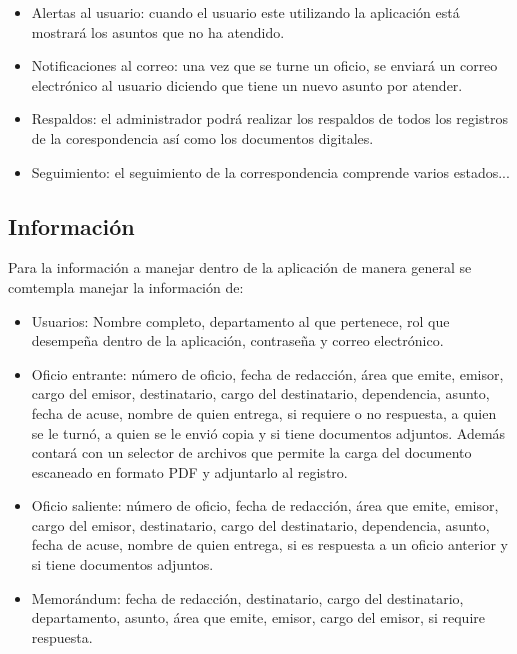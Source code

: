 \begin{itemize}
	\item Alertas al usuario: cuando el usuario este utilizando la aplicación está mostrará los asuntos que no ha atendido. 
	\item Notificaciones al correo: una vez que se turne un oficio, se enviará un correo electrónico al usuario diciendo que tiene un nuevo asunto por atender. 
	\item Respaldos: el administrador podrá realizar los respaldos de todos los registros de la corespondencia así como los documentos digitales.
	\item Seguimiento: el seguimiento de la correspondencia comprende varios estados...
\end{itemize}


\subsection{Información}

Para la información a manejar dentro de la aplicación de manera general se comtempla manejar la información de:
\begin{itemize}
	\item Usuarios: Nombre completo, departamento al que pertenece, rol que desempeña dentro de la aplicación, contraseña y correo electrónico.
	\item Oficio entrante: número de oficio, fecha de redacción, área que emite, emisor, cargo del emisor, destinatario, cargo del destinatario, dependencia, asunto, fecha de acuse, nombre de quien entrega, si requiere o no respuesta, a quien se le turnó, a quien se le envió copia y si tiene documentos adjuntos. Además contará con un selector de archivos que permite la carga del documento escaneado en formato PDF y adjuntarlo al registro.
	\item Oficio saliente: número de oficio, fecha de redacción, área que emite, emisor, cargo del emisor, destinatario, cargo del destinatario, dependencia, asunto, fecha de acuse, nombre de quien entrega, si es respuesta a un oficio anterior y si tiene documentos adjuntos.
	\item Memorándum: fecha de redacción, destinatario, cargo del destinatario, departamento, asunto, área que emite, emisor, cargo del emisor, si require respuesta. 
\end{itemize}

